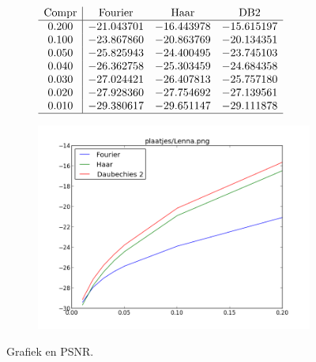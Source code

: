 \documentclass[11pt]{report}
\theoremstyle{plain}
\theoremstyle{remark}
\begin{document}
\begin{figure}
	\centering
	\begin{subfigure}[t]{0.48\textwidth}
	\centering
	\vspace{10pt}
	\begingroup
	
\renewcommand*{\arraystretch}{1.5}
	$\begin{array}{c | c c c c}
	\text{Compr} & \text{Fourier} & \text{Haar} & \text{DB2} \\ \hline
0.200 & -21.043701 & -16.443978 & -15.615197 \\
0.100 & -23.867860 & -20.863769 & -20.134351 \\
0.050 & -25.825943 & -24.400495 & -23.745103 \\
0.040 & -26.362758 & -25.303459 & -24.684358 \\
0.030 & -27.024421 & -26.407813 & -25.757180 \\
0.020 & -27.928360 & -27.754692 & -27.139561 \\
0.010 & -29.380617 & -29.651147 & -29.111878 \\ \hline
	\end{array}$
	\endgroup
	\end{subfigure}	
	\begin{subfigure}[t]{0.48\textwidth}
		\centering
		\vspace{0pt}
		\includegraphics[height=\textwidth]{plaatjes/grafiek_Lenna_0_15-0_01.png}
	\end{subfigure}
	\caption{Grafiek en PSNR.}
\end{figure}
\restoregeometry
\pagebreak
\end{document}
